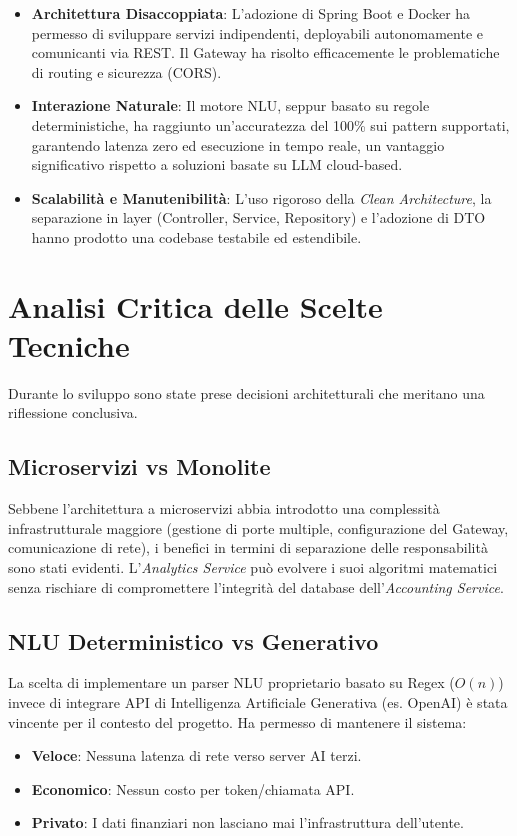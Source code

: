 \begin{itemize}
    \item \textbf{Architettura Disaccoppiata}: L'adozione di Spring Boot e Docker ha permesso di sviluppare servizi indipendenti, deployabili autonomamente e comunicanti via REST. Il Gateway ha risolto efficacemente le problematiche di routing e sicurezza (CORS).
    \item \textbf{Interazione Naturale}: Il motore NLU, seppur basato su regole deterministiche, ha raggiunto un'accuratezza del 100\% sui pattern supportati, garantendo latenza zero ed esecuzione in tempo reale, un vantaggio significativo rispetto a soluzioni basate su LLM cloud-based.
    \item \textbf{Scalabilità e Manutenibilità}: L'uso rigoroso della \textit{Clean Architecture}, la separazione in layer (Controller, Service, Repository) e l'adozione di DTO hanno prodotto una codebase testabile ed estendibile.
\end{itemize}

\section{Analisi Critica delle Scelte Tecniche}

Durante lo sviluppo sono state prese decisioni architetturali che meritano una riflessione conclusiva.

\subsection{Microservizi vs Monolite}
Sebbene l'architettura a microservizi abbia introdotto una complessità infrastrutturale maggiore (gestione di porte multiple, configurazione del Gateway, comunicazione di rete), i benefici in termini di separazione delle responsabilità sono stati evidenti. L'\textit{Analytics Service} può evolvere i suoi algoritmi matematici senza rischiare di compromettere l'integrità del database dell'\textit{Accounting Service}.

\subsection{NLU Deterministico vs Generativo}
La scelta di implementare un parser NLU proprietario basato su Regex ($O(n)$) invece di integrare API di Intelligenza Artificiale Generativa (es. OpenAI) è stata vincente per il contesto del progetto. Ha permesso di mantenere il sistema:
\begin{itemize}
    \item \textbf{Veloce}: Nessuna latenza di rete verso server AI terzi.
    \item \textbf{Economico}: Nessun costo per token/chiamata API.
    \item \textbf{Privato}: I dati finanziari non lasciano mai l'infrastruttura dell'utente.
\end{itemize}

